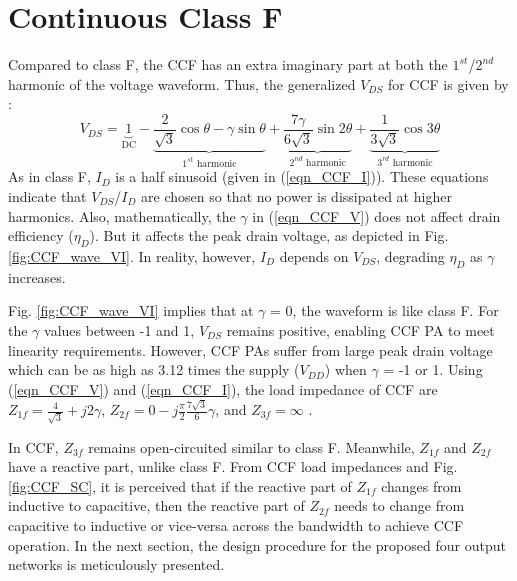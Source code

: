\documentclass[conference]{IEEEtran}
\begin{document}
\section{Continuous Class F}
\label{section:CCF}
\vspace{-0.05in}
Compared to class F, the CCF has an extra imaginary part at both the $1^{st}$/$2^{nd}$ harmonic of the voltage waveform. Thus, the generalized $V_{DS}$ for CCF is given by \cite{ECCF_Carrubba}:
\begin{equation}
V_{DS}=\underbrace{1}_{\text{DC}}-\underbrace{\frac{2}{\sqrt{3}} \cos \theta-\gamma \sin \theta}_{\text{$1^{st}$ harmonic}}+\underbrace{\frac{7 \gamma}{6 \sqrt{3}} \sin 2 \theta}_{\text{$2^{nd}$ harmonic}}+\underbrace{\frac{1}{3 \sqrt{3}} \cos 3 \theta}_{\text{$3^{rd}$ harmonic}}
\label{eqn_CCF_V}
\end{equation}
As in class F, $I_{D}$ is a half sinusoid (given in (\ref{eqn_CCF_I})). These equations indicate that $V_{DS}$/$I_{D}$ are chosen so that no power is dissipated at higher harmonics. Also, mathematically, the $\gamma$ in (\ref{eqn_CCF_V}) does not affect drain efficiency ($\eta_D$). But it affects the peak drain voltage, as depicted in Fig. \ref{fig:CCF_wave_VI}. In reality, however, $I_{D}$ depends on $V_{DS}$, degrading $\eta_D$ as $\gamma$ increases.


Fig. \ref{fig:CCF_wave_VI} implies that at $\gamma$ = 0, the waveform is like class F. For the $\gamma$ values between -1 and 1, $V_{DS}$ remains positive, enabling CCF PA to meet linearity requirements. However, CCF PAs suffer from large peak drain voltage which can be as high as 3.12 times the supply ($V_{DD}$) when $\gamma$ = -1 or 1. Using (\ref{eqn_CCF_V}) and (\ref{eqn_CCF_I}), the load impedance of CCF  are $Z_{1f}=\frac{4}{\sqrt{3}}+j 2 \gamma$, $Z_{2f}=0-j \frac{\pi}{2} \frac{7 \sqrt{3}}{6} \gamma$, and $Z_{3f}=\infty$ \cite{CCFDesign_ali}.


In CCF, $Z_{3f}$ remains open-circuited similar to class F. Meanwhile, $Z_{1f}$ and $Z_{2f}$ have a reactive part, unlike class F. From CCF load impedances and Fig. \ref{fig:CCF_SC}, it is perceived that if the reactive part of $Z_{1f}$ changes from inductive to capacitive, then the reactive part of $Z_{2f}$  needs to change from capacitive to inductive or vice-versa across the bandwidth to achieve CCF operation. In the next section, the design procedure for the proposed four output networks is meticulously presented. 
\end{document}
